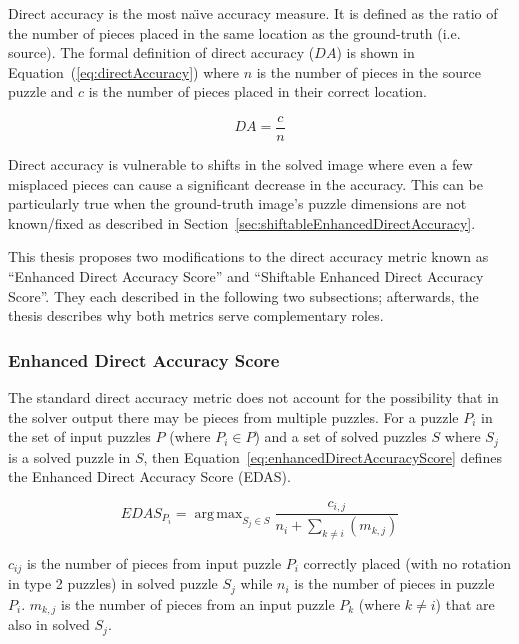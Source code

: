 \documentclass{report}
\def\eref#1{(\ref{#1})}
\DeclareMathOperator*{\argmax}{arg\,max} %
\begin{document}
Direct accuracy is the most na\"{\i}ve accuracy measure.  It is defined as the ratio of the number of pieces placed in the same location as the ground-truth (i.e. source).  The formal definition of direct accuracy ($DA$) is shown in Equation~\eref{eq:directAccuracy} where $n$ is the number of pieces in the source puzzle and $c$ is the number of pieces placed in their correct location.

\begin{equation} \label{eq:directAccuracy}
DA = \frac{c}{n}
\end{equation}

Direct accuracy is vulnerable to shifts in the solved image where even a few misplaced pieces can cause a significant decrease in the accuracy.  This can be particularly true when the ground-truth image's puzzle dimensions are not known/fixed as described in Section~\ref{sec:shiftableEnhancedDirectAccuracy}.

This thesis proposes two modifications to the direct accuracy metric known as ``Enhanced Direct Accuracy Score'' and ``Shiftable Enhanced Direct Accuracy Score''.  They each described in the following two subsections; afterwards, the thesis describes why both metrics serve complementary roles.

\subsubsection{Enhanced Direct Accuracy Score}\label{sec:enhancedDirectAccuracyScore}

The standard direct accuracy metric does not account for the possibility that in the solver output there may be pieces from multiple puzzles.  For a puzzle $P_i$ in the set of input puzzles $P$ (where $P_i \in P$) and a set of solved puzzles $S$ where $S_j$ is a solved puzzle in $S$, then Equation~\ref{eq:enhancedDirectAccuracyScore} defines the Enhanced Direct Accuracy Score (EDAS).

\begin{equation} \label{eq:enhancedDirectAccuracyScore}
EDAS_{P_i} = \argmax_{S_j \in S}\frac{c_{i,j}}{n_i + \sum_{k \ne i}(m_{k,j})}
\end{equation}

$c_{ij}$ is the number of pieces from input puzzle $P_i$ correctly placed (with no rotation in type 2 puzzles) in solved puzzle $S_j$ while $n_i$ is the number of pieces in puzzle $P_i$. $m_{k,j}$ is the number of pieces from an input puzzle $P_k$ (where $k \ne i$) that are also in solved $S_j$.
\end{document}
